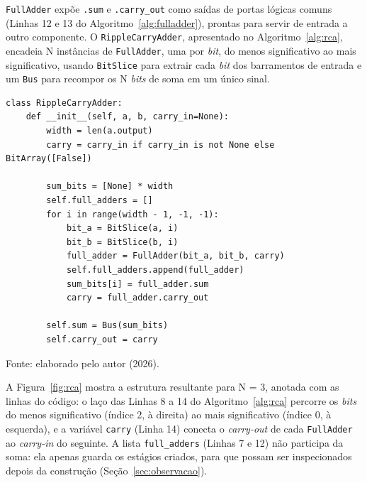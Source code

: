 \texttt{FullAdder} expõe \texttt{.sum} e \texttt{.carry\_out} como saídas de portas lógicas comuns (Linhas 12 e 13 do Algoritmo~\ref{alg:fulladder}), prontas para servir de entrada a outro componente. O \texttt{RippleCarryAdder}, apresentado no Algoritmo~\ref{alg:rca}, encadeia N instâncias de \texttt{FullAdder}, uma por \textit{bit}, do menos significativo ao mais significativo, usando \texttt{BitSlice} para extrair cada \textit{bit} dos barramentos de entrada e um \texttt{Bus} para recompor os N \textit{bits} de soma em um único sinal.

\begin{algoritmo}[H]
\caption{RippleCarryAdder (components/ripple\_carry\_adder.py).}
\label{alg:rca}
\begin{verbatim}
class RippleCarryAdder:
    def __init__(self, a, b, carry_in=None):
        width = len(a.output)
        carry = carry_in if carry_in is not None else BitArray([False])

        sum_bits = [None] * width
        self.full_adders = []
        for i in range(width - 1, -1, -1):
            bit_a = BitSlice(a, i)
            bit_b = BitSlice(b, i)
            full_adder = FullAdder(bit_a, bit_b, carry)
            self.full_adders.append(full_adder)
            sum_bits[i] = full_adder.sum
            carry = full_adder.carry_out

        self.sum = Bus(sum_bits)
        self.carry_out = carry
\end{verbatim}
\begin{center}
\footnotesize Fonte: elaborado pelo autor (2026).
\end{center}
\end{algoritmo}

A Figura~\ref{fig:rca} mostra a estrutura resultante para N = 3, anotada com as linhas do código: o laço das Linhas 8 a 14 do Algoritmo~\ref{alg:rca} percorre os \textit{bits} do menos significativo (índice 2, à direita) ao mais significativo (índice 0, à esquerda), e a variável \texttt{carry} (Linha 14) conecta o \textit{carry-out} de cada \texttt{FullAdder} ao \textit{carry-in} do seguinte. A lista \texttt{full\_adders} (Linhas 7 e 12) não participa da soma: ela apenas guarda os estágios criados, para que possam ser inspecionados depois da construção (Seção~\ref{sec:observacao}).

